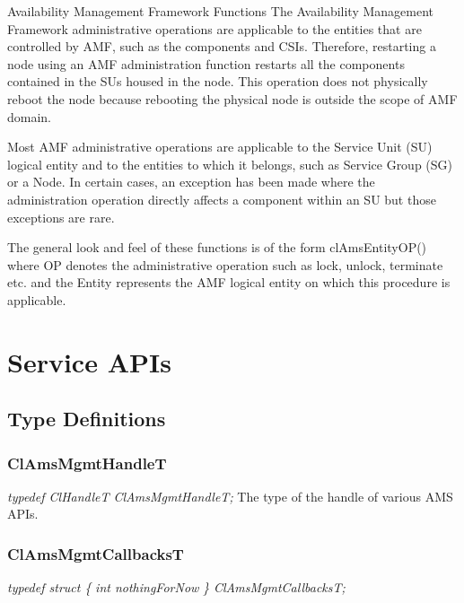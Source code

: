 \begin{Desc}
\item[Availability Management Framework Functions]The Availability Management Framework administrative operations are applicable to the 
entities that are controlled by AMF, such as the components and CSIs. Therefore, restarting a node using an AMF administration function 
restarts all the components contained in the SUs housed in the node. This operation does not physically reboot the node because rebooting 
the physical node is outside the scope of AMF domain. \par
 \par
 Most AMF administrative operations are applicable to the Service Unit (SU) logical entity and to the entities to which it belongs, 
 such as Service Group (SG) or a Node. In certain cases, an exception has been made where the administration operation directly affects 
 a component within an SU but those exceptions are rare.\par
 \par
 The general look and feel of these functions is of the form cl\-Ams\-Entity\-OP() where OP denotes the administrative operation such as 
 lock, unlock, terminate etc. and the Entity represents the AMF logical entity on which this procedure is applicable. \end{Desc}



\chapter{Service APIs}

\section{Type Definitions}
\subsection{ClAmsMgmtHandleT}
\textit{typedef ClHandleT ClAmsMgmtHandleT;}
\newline
\newline
The type of the handle of various AMS APIs.

\subsection{ClAmsMgmtCallbacksT}
\textit{typedef struct \{}
\newline  \textit{int nothingForNow}
\newline \textit{\} ClAmsMgmtCallbacksT;}
\newline
\newline



